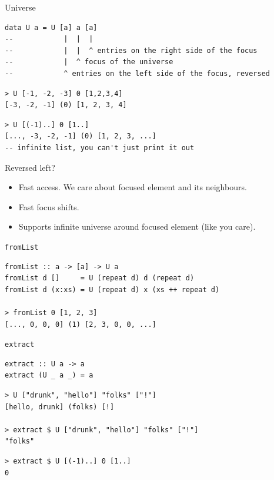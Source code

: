 \documentclass[presentation,aspectratio=169,smaller]{beamer}
\begin{document}
\begin{frame}[label={sec:orge5d0d53},fragile]{Universe}
 \begin{verbatim}
data U a = U [a] a [a]
--            |  |  |
--            |  |  ^ entries on the right side of the focus
--            |  ^ focus of the universe
--            ^ entries on the left side of the focus, reversed
\end{verbatim}

\pause

\begin{verbatim}
> U [-1, -2, -3] 0 [1,2,3,4]
[-3, -2, -1] (0) [1, 2, 3, 4]
\end{verbatim}

\pause

\begin{verbatim}
> U [(-1)..] 0 [1..]
[..., -3, -2, -1] (0) [1, 2, 3, ...]
-- infinite list, you can't just print it out
\end{verbatim}
\end{frame}

\begin{frame}[label={sec:org850d612}]{Reversed left?}
\begin{itemize}
\item Fast access. We care about focused element and its neighbours.
\item Fast focus shifts.
\item Supports infinite universe around focused element (like you care).
\end{itemize}
\end{frame}

\begin{frame}[label={sec:org2044dde},fragile]{\texttt{fromList}}
 \begin{verbatim}
fromList :: a -> [a] -> U a
fromList d []     = U (repeat d) d (repeat d)
fromList d (x:xs) = U (repeat d) x (xs ++ repeat d)

> fromList 0 [1, 2, 3]
[..., 0, 0, 0] (1) [2, 3, 0, 0, ...]
\end{verbatim}
\end{frame}

\begin{frame}[label={sec:org8677fdb},fragile]{\texttt{extract}}
 \begin{verbatim}
extract :: U a -> a
extract (U _ a _) = a
\end{verbatim}

\pause

\begin{verbatim}
> U ["drunk", "hello"] "folks" ["!"]
[hello, drunk] (folks) [!]

> extract $ U ["drunk", "hello"] "folks" ["!"]
"folks"
\end{verbatim}

\pause

\begin{verbatim}
> extract $ U [(-1)..] 0 [1..]
0
\end{verbatim}
\end{frame}
\end{document}
